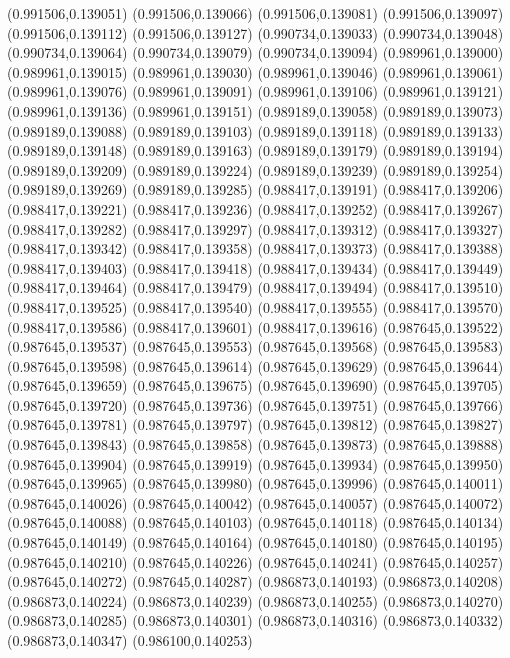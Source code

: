 (0.991506,0.139051)
(0.991506,0.139066)
(0.991506,0.139081)
(0.991506,0.139097)
(0.991506,0.139112)
(0.991506,0.139127)
(0.990734,0.139033)
(0.990734,0.139048)
(0.990734,0.139064)
(0.990734,0.139079)
(0.990734,0.139094)
(0.989961,0.139000)
(0.989961,0.139015)
(0.989961,0.139030)
(0.989961,0.139046)
(0.989961,0.139061)
(0.989961,0.139076)
(0.989961,0.139091)
(0.989961,0.139106)
(0.989961,0.139121)
(0.989961,0.139136)
(0.989961,0.139151)
(0.989189,0.139058)
(0.989189,0.139073)
(0.989189,0.139088)
(0.989189,0.139103)
(0.989189,0.139118)
(0.989189,0.139133)
(0.989189,0.139148)
(0.989189,0.139163)
(0.989189,0.139179)
(0.989189,0.139194)
(0.989189,0.139209)
(0.989189,0.139224)
(0.989189,0.139239)
(0.989189,0.139254)
(0.989189,0.139269)
(0.989189,0.139285)
(0.988417,0.139191)
(0.988417,0.139206)
(0.988417,0.139221)
(0.988417,0.139236)
(0.988417,0.139252)
(0.988417,0.139267)
(0.988417,0.139282)
(0.988417,0.139297)
(0.988417,0.139312)
(0.988417,0.139327)
(0.988417,0.139342)
(0.988417,0.139358)
(0.988417,0.139373)
(0.988417,0.139388)
(0.988417,0.139403)
(0.988417,0.139418)
(0.988417,0.139434)
(0.988417,0.139449)
(0.988417,0.139464)
(0.988417,0.139479)
(0.988417,0.139494)
(0.988417,0.139510)
(0.988417,0.139525)
(0.988417,0.139540)
(0.988417,0.139555)
(0.988417,0.139570)
(0.988417,0.139586)
(0.988417,0.139601)
(0.988417,0.139616)
(0.987645,0.139522)
(0.987645,0.139537)
(0.987645,0.139553)
(0.987645,0.139568)
(0.987645,0.139583)
(0.987645,0.139598)
(0.987645,0.139614)
(0.987645,0.139629)
(0.987645,0.139644)
(0.987645,0.139659)
(0.987645,0.139675)
(0.987645,0.139690)
(0.987645,0.139705)
(0.987645,0.139720)
(0.987645,0.139736)
(0.987645,0.139751)
(0.987645,0.139766)
(0.987645,0.139781)
(0.987645,0.139797)
(0.987645,0.139812)
(0.987645,0.139827)
(0.987645,0.139843)
(0.987645,0.139858)
(0.987645,0.139873)
(0.987645,0.139888)
(0.987645,0.139904)
(0.987645,0.139919)
(0.987645,0.139934)
(0.987645,0.139950)
(0.987645,0.139965)
(0.987645,0.139980)
(0.987645,0.139996)
(0.987645,0.140011)
(0.987645,0.140026)
(0.987645,0.140042)
(0.987645,0.140057)
(0.987645,0.140072)
(0.987645,0.140088)
(0.987645,0.140103)
(0.987645,0.140118)
(0.987645,0.140134)
(0.987645,0.140149)
(0.987645,0.140164)
(0.987645,0.140180)
(0.987645,0.140195)
(0.987645,0.140210)
(0.987645,0.140226)
(0.987645,0.140241)
(0.987645,0.140257)
(0.987645,0.140272)
(0.987645,0.140287)
(0.986873,0.140193)
(0.986873,0.140208)
(0.986873,0.140224)
(0.986873,0.140239)
(0.986873,0.140255)
(0.986873,0.140270)
(0.986873,0.140285)
(0.986873,0.140301)
(0.986873,0.140316)
(0.986873,0.140332)
(0.986873,0.140347)
(0.986100,0.140253)

